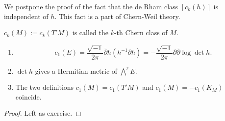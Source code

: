 \documentclass[12pt]{article}
\begin{document}
\begin{remark}
  We postpone the proof of the fact that the de Rham class \([c_k(h)]\) is independent
  of \(h\). This fact is a part of Chern-Weil theory.
\end{remark}

\begin{definition}
  \(c_k(M):=c_k(T'M)\) is called the \(k\)-th Chern class of \(M\).  
\end{definition}
\begin{lemma}\hfill
\begin{enumerate}[(1)]
\item \[
    c_1(E)=\frac{\sqrt{-1}}{2\pi}\bar{\partial}h(h^{-1}\partial h)
    =-\frac{\sqrt{-1}}{2\pi}\partial\bar{\partial}\log\det h
  .\] 
\item \(\det h\) gives a Hermitian metric of \(\bigwedge^r E\).
\item The two definitions \(c_1(M)=c_1(T'M)\) and \(c_1(M)=-c_1(K_M)\) coincide.
\end{enumerate}
\end{lemma}
\begin{proof}
  Left as exercise.
\end{proof}
\end{document}
